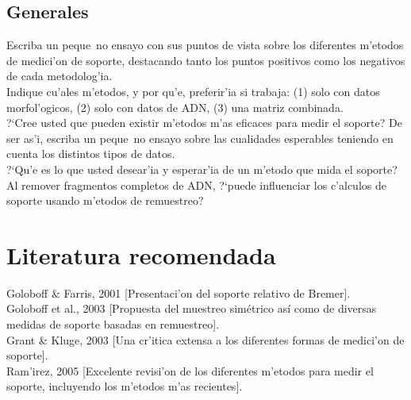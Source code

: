 \subsection{Generales}
\noindent
Escriba un peque~no ensayo con sus puntos de vista sobre los diferentes m'etodos de medici'on de soporte, destacando tanto los puntos positivos como los negativos de cada metodolog'ia.\\
Indique cu'ales m'etodos, y por qu'e, preferir'ia si trabaja: (1) solo con datos morfol'ogicos, (2) solo con datos de ADN, (3) una matriz combinada.\\
?`Cree usted que pueden existir m'etodos m'as eficaces para medir el soporte? De ser as'i, escriba un peque~no ensayo sobre las cualidades esperables teniendo en cuenta los distintos tipos de datos.\\
?`Qu'e es lo que usted desear'ia y esperar'ia de un m'etodo que mida el soporte?\\
 Al remover fragmentos completos de ADN, ?`puede influenciar los c'alculos de soporte usando m'etodos de remuestreo?
\section{Literatura recomendada}
\noindent
Goloboff \& Farris, 2001 [Presentaci'on del soporte relativo de Bremer].\\
Goloboff et al., 2003 [Propuesta del muestreo sim\'etrico as\'i como de diversas medidas de soporte basadas en remuestreo].\\
Grant \& Kluge, 2003 [Una cr'itica extensa a los diferentes formas de medici'on de soporte].\\
Ram'irez, 2005 [Excelente revisi'on de los diferentes m'etodos para medir el soporte, incluyendo los m'etodos m'as recientes].
